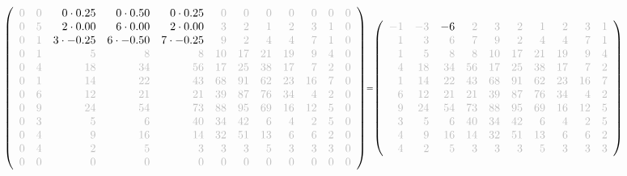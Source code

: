 \documentclass[11pt]{article}
\begin{document}
    
    \[\scriptstyle \def\g{\color{lightgray}}\left(\begin{array}{rrrrrrrrrrrr}\g{0} & \g{0} & 0\cdot 0.25 & 0\cdot 0.50 & 0\cdot 0.25 & \g{0} & \g{0} & \g{0} & \g{0} & \g{0} & \g{0} & \g{0}\\\g{0} & \g{5} & 2\cdot 0.00 & 6\cdot 0.00 & 2\cdot 0.00 & \g{3} & \g{2} & \g{1} & \g{2} & \g{3} & \g{1} & \g{0}\\\g{0} & \g{1} & 3\cdot -0.25 & 6\cdot -0.50 & 7\cdot -0.25 & \g{9} & \g{2} & \g{4} & \g{4} & \g{7} & \g{1} & \g{0}\\\g{0} & \g{1} & \g{5} & \g{8} & \g{8} & \g{10} & \g{17} & \g{21} & \g{19} & \g{9} & \g{4} & \g{0}\\\g{0} & \g{4} & \g{18} & \g{34} & \g{56} & \g{17} & \g{25} & \g{38} & \g{17} & \g{7} & \g{2} & \g{0}\\\g{0} & \g{1} & \g{14} & \g{22} & \g{43} & \g{68} & \g{91} & \g{62} & \g{23} & \g{16} & \g{7} & \g{0}\\\g{0} & \g{6} & \g{12} & \g{21} & \g{21} & \g{39} & \g{87} & \g{76} & \g{34} & \g{4} & \g{2} & \g{0}\\\g{0} & \g{9} & \g{24} & \g{54} & \g{73} & \g{88} & \g{95} & \g{69} & \g{16} & \g{12} & \g{5} & \g{0}\\\g{0} & \g{3} & \g{5} & \g{6} & \g{40} & \g{34} & \g{42} & \g{6} & \g{4} & \g{2} & \g{5} & \g{0}\\\g{0} & \g{4} & \g{9} & \g{16} & \g{14} & \g{32} & \g{51} & \g{13} & \g{6} & \g{6} & \g{2} & \g{0}\\\g{0} & \g{4} & \g{2} & \g{5} & \g{3} & \g{3} & \g{3} & \g{5} & \g{3} & \g{3} & \g{3} & \g{0}\\\g{0} & \g{0} & \g{0} & \g{0} & \g{0} & \g{0} & \g{0} & \g{0} & \g{0} & \g{0} & \g{0} & \g{0}\end{array}\right)=\left(\begin{array}{rrrrrrrrrrrr}\g{-1} & \g{-3} & -6 & \g{2} & \g{3} & \g{2} & \g{1} & \g{2} & \g{3} & \g{1}\\\g{1} & \g{3} & \g{6} & \g{7} & \g{9} & \g{2} & \g{4} & \g{4} & \g{7} & \g{1}\\\g{1} & \g{5} & \g{8} & \g{8} & \g{10} & \g{17} & \g{21} & \g{19} & \g{9} & \g{4}\\\g{4} & \g{18} & \g{34} & \g{56} & \g{17} & \g{25} & \g{38} & \g{17} & \g{7} & \g{2}\\\g{1} & \g{14} & \g{22} & \g{43} & \g{68} & \g{91} & \g{62} & \g{23} & \g{16} & \g{7}\\\g{6} & \g{12} & \g{21} & \g{21} & \g{39} & \g{87} & \g{76} & \g{34} & \g{4} & \g{2}\\\g{9} & \g{24} & \g{54} & \g{73} & \g{88} & \g{95} & \g{69} & \g{16} & \g{12} & \g{5}\\\g{3} & \g{5} & \g{6} & \g{40} & \g{34} & \g{42} & \g{6} & \g{4} & \g{2} & \g{5}\\\g{4} & \g{9} & \g{16} & \g{14} & \g{32} & \g{51} & \g{13} & \g{6} & \g{6} & \g{2}\\\g{4} & \g{2} & \g{5} & \g{3} & \g{3} & \g{3} & \g{5} & \g{3} & \g{3} & \g{3}\end{array}\right)\]
\end{document}
